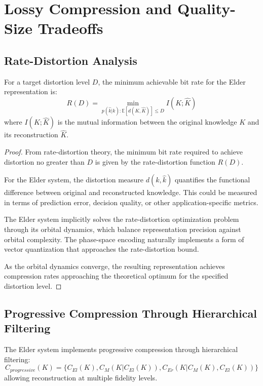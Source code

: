 \section{Lossy Compression and Quality-Size Tradeoffs}

\subsection{Rate-Distortion Analysis}

\begin{theorem}
For a target distortion level $D$, the minimum achievable bit rate for the Elder representation is:
\begin{equation}
R(D) = \min_{p(\hat{k}|k) : \mathbb{E}[d(K,\hat{K})] \leq D} I(K; \hat{K})
\end{equation}
where $I(K; \hat{K})$ is the mutual information between the original knowledge $K$ and its reconstruction $\hat{K}$.
\end{theorem}

\begin{proof}
From rate-distortion theory, the minimum bit rate required to achieve distortion no greater than $D$ is given by the rate-distortion function $R(D)$.

For the Elder system, the distortion measure $d(k, \hat{k})$ quantifies the functional difference between original and reconstructed knowledge. This could be measured in terms of prediction error, decision quality, or other application-specific metrics.

The Elder system implicitly solves the rate-distortion optimization problem through its orbital dynamics, which balance representation precision against orbital complexity. The phase-space encoding naturally implements a form of vector quantization that approaches the rate-distortion bound.

As the orbital dynamics converge, the resulting representation achieves compression rates approaching the theoretical optimum for the specified distortion level.
\end{proof}

\subsection{Progressive Compression Through Hierarchical Filtering}

\begin{theorem}
The Elder system implements progressive compression through hierarchical filtering:
\begin{equation}
C_{progressive}(K) = \{C_{El}(K), C_{M}(K | C_{El}(K)), C_{Er}(K | C_{M}(K), C_{El}(K))\}
\end{equation}
allowing reconstruction at multiple fidelity levels.
\end{theorem}


